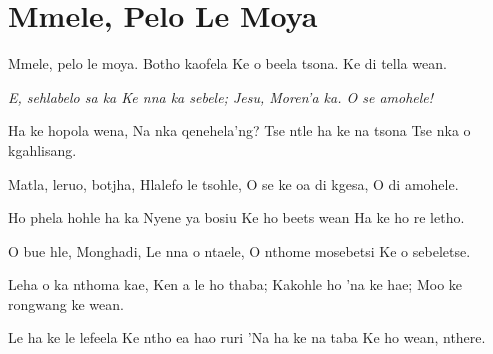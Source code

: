 \starttocol
\chapter{Mmele, Pelo Le Moya}
\nexttocol
\hfill{\it }
\stoptocol
\starttocol
\startlines
{\sc Mmele}, pelo le moya.
Botho kaofela
Ke o beela tsona.
Ke di tella wean.

{\it E, sehlabelo sa ka
Ke nna ka sebele;
Jesu, Moren'a ka.
O se amohele!}

Ha ke hopola wena,
Na nka qenehela'ng?
Tse ntle ha ke na tsona
Tse nka o kgahlisang.

Matla, leruo, botjha,
Hlalefo le tsohle,
O se ke oa di kgesa,
O di amohele.

Ho phela hohle ha ka
Nyene ya bosiu
Ke ho beets wean
Ha ke ho re letho.

O bue hle, Monghadi,
Le nna o ntaele,
O nthome mosebetsi
Ke o sebeletse.

Leha o ka nthoma kae,
Ken a le ho thaba;
Kakohle ho 'na ke hae;
Moo ke rongwang ke wean.

Le ha ke le lefeela
Ke ntho ea hao ruri
'Na ha ke na taba
Ke ho wean, nthere.
\stoplines
\nexttocol

\stoptocol
